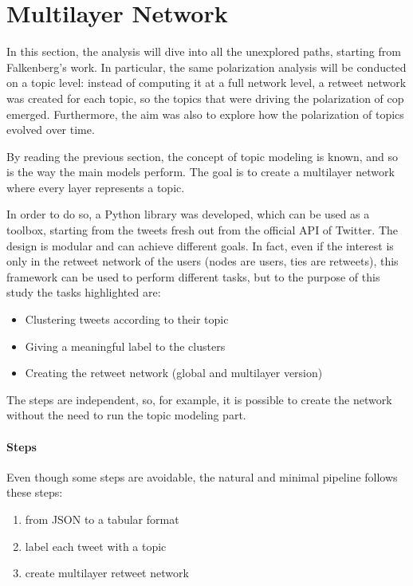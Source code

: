 
\section{Multilayer Network}

In this section, the analysis will dive into all the unexplored paths, starting from Falkenberg’s work. In particular, the same polarization analysis will be conducted on a topic level: instead of computing it at a full network level, a retweet network was created for each topic, so the topics that were driving the polarization of cop emerged. Furthermore, the aim was also  to explore how the polarization of topics evolved over time.

By reading the previous section, the concept of topic modeling is known, and so is the way the main models perform. The goal is to create a multilayer network where every layer represents a topic.

In order to do so, a Python library was developed, which can be used as a toolbox, starting from the tweets fresh out from the official API of Twitter. The design is modular and can achieve different goals. In fact, even if the  interest is only in the retweet network of the users (nodes are users, ties are retweets), this framework can be used to perform different tasks, but to the purpose of this study the tasks highlighted are: 

\begin{itemize}
    \item Clustering tweets according to their topic
    \item Giving a meaningful label to the clusters
    \item Creating the retweet network (global and multilayer version)


\end{itemize}

The steps are independent, so, for example, it is possible to create the network without the need to run the topic modeling part.


\paragraph{Steps}
Even though some steps are avoidable, the natural and minimal pipeline follows these steps:


\begin{enumerate}
    \item from JSON to a tabular format 
    \item label each tweet with a topic
    \item create multilayer retweet network  
    
\end{enumerate} 


